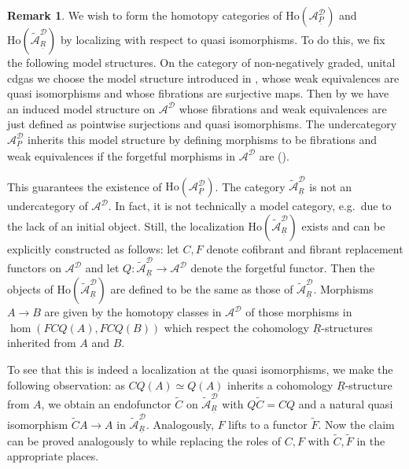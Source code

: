 \documentclass[12pt,a4paper]{article}
\theoremstyle{definition}
\newtheorem{rem}[thm]{Remark}
\begin{document}
\begin{rem}\label{rem:homcats}
We wish to form the homotopy categories of $\mathrm{Ho}(\mathcal{A}_{\underline{P}}^\mathcal{D})$ and $\mathrm{Ho}(\widetilde{\mathcal{A}}^\mathcal{D}_{\underline{R}})$ by localizing with respect to quasi isomorphisms. To do this, we fix the following model structures. On the category of non-negatively graded, unital cdgas we choose the model structure introduced in \cite{BG}, whose weak equivalences are quasi isomorphisms and whose fibrations are surjective maps. Then by \cite[Theorem 11.6.1]{Hirschhorn} we have an induced model structure on $\mathcal{A}^\mathcal{D}$ whose fibrations and weak equivalences are just defined as pointwise surjections and quasi isomorphisms. The undercategory $\mathcal{A}^\mathcal{D}_{\underline{P}}$ inherits this model structure by defining morphisms to be fibrations and weak equivalences if the forgetful morphisms in $\mathcal{A}^\mathcal{D}$ are (\cite[Theorem 7.6.5]{Hirschhorn}).

This guarantees the existence of $\mathrm{Ho}(\mathcal{A}_{\underline{P}}^\mathcal{D})$. The category $\widetilde{\mathcal{A}}^\mathcal{D}_{\underline{R}}$ is not an undercategory of $\mathcal{A}^\mathcal{D}$. In fact, it is not technically a model category, e.g.\ due to the lack of an initial object. Still, the localization $\mathrm{Ho}(\widetilde{\mathcal{A}}^\mathcal{D}_{\underline{R}})$ exists and can be explicitly constructed as follows: let $C,F$ denote cofibrant and fibrant replacement functors on $\mathcal{A}^\mathcal{D}$ and let $Q\colon \widetilde{\mathcal{A}}^\mathcal{D}_{\underline{R}}\rightarrow \mathcal{A}^\mathcal{D}$ denote the forgetful functor. Then the objects of $\mathrm{Ho}(\widetilde{\mathcal{A}}^\mathcal{D}_{\underline{R}})$ are defined to be the same as those of $\widetilde{\mathcal{A}}^\mathcal{D}_{\underline{R}}$. Morphisms $A\rightarrow B$ are given by the homotopy classes in $\mathcal{A}^\mathcal{D}$ of those morphisms in $\hom(FCQ(A),FCQ(B))$ which respect the cohomology $\underline{R}$-structures inherited from $A$ and $B$.

To see that this is indeed a localization at the quasi isomorphisms, we make the following observation: as $CQ(A)\simeq Q(A)$ inherits a cohomology $\underline{R}$-structure from $A$, we obtain an endofunctor $\tilde{C}$ on $\widetilde{\mathcal{A}}^\mathcal{D}_{\underline{R}}$ with $Q\tilde{C}=CQ$ and a natural quasi isomorphism $\tilde{C}A\rightarrow A$ in $\widetilde{\mathcal{A}}^\mathcal{D}_{\underline{R}}$. Analogously, $F$ lifts to a functor $\tilde{F}$.
Now the claim can be proved analogously to \cite[Theorem 8.3.5]{Hirschhorn} while replacing the roles of $C,F$ with $\tilde{C},\tilde{F}$ in the appropriate places.


\end{rem}
\end{document}
